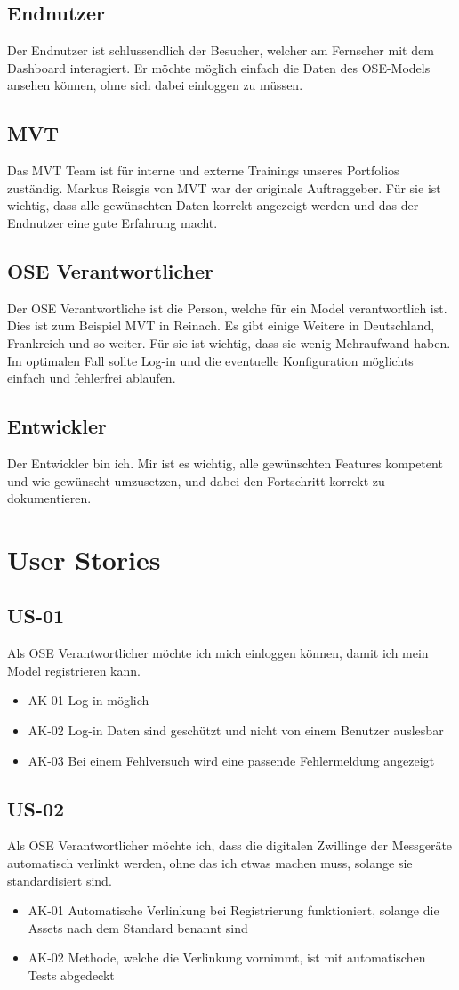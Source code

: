 \subsection{Endnutzer}
Der Endnutzer ist schlussendlich der Besucher, welcher am Fernseher mit dem Dashboard interagiert. Er möchte möglich einfach die Daten des OSE-Models ansehen können, ohne sich dabei einloggen zu müssen.
\subsection{MVT}
Das MVT Team ist für interne und externe Trainings unseres Portfolios zuständig. Markus Reisgis von MVT war der originale Auftraggeber. Für sie ist wichtig, dass alle gewünschten Daten korrekt angezeigt werden und das der Endnutzer eine gute Erfahrung macht.
\subsection{OSE Verantwortlicher}
Der OSE Verantwortliche ist die Person, welche für ein Model verantwortlich ist. Dies ist zum Beispiel MVT in Reinach. Es gibt einige Weitere in Deutschland, Frankreich und so weiter. Für sie ist wichtig, dass sie wenig Mehraufwand haben. Im optimalen Fall sollte Log-in und die eventuelle Konfiguration möglichts einfach und fehlerfrei ablaufen.
\subsection{Entwickler}
Der Entwickler bin ich. Mir ist es wichtig, alle gewünschten Features kompetent und wie gewünscht umzusetzen, und dabei den Fortschritt korrekt zu dokumentieren.
\section{User Stories}
\subsection{US-01}
Als OSE Verantwortlicher möchte ich mich einloggen können, damit ich mein Model registrieren kann.
\begin{itemize}
  \item AK-01 Log-in möglich
  \item AK-02 Log-in Daten sind geschützt und nicht von einem Benutzer auslesbar
  \item AK-03 Bei einem Fehlversuch wird eine passende Fehlermeldung angezeigt
\end{itemize}
\subsection{US-02}
Als OSE Verantwortlicher möchte ich, dass die digitalen Zwillinge der Messgeräte automatisch verlinkt werden, ohne das ich etwas machen muss, solange sie standardisiert sind.
\begin{itemize}
  \item AK-01 Automatische Verlinkung bei Registrierung funktioniert, solange die Assets nach dem Standard benannt sind
  \item AK-02 Methode, welche die Verlinkung vornimmt, ist mit automatischen Tests abgedeckt
\end{itemize}
